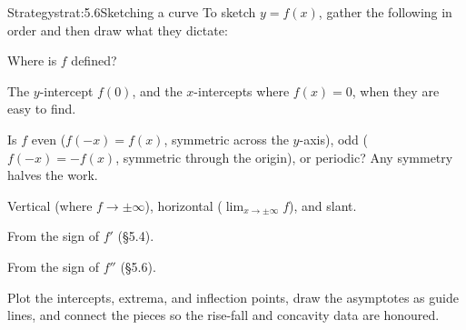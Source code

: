 \documentclass[a4paper,12pt,oneside]{memoir}
\begin{document}
\begin{envstrategy}{Strategy}{strat:5.6}{Sketching a curve}
To sketch \(y = f(x)\), gather the following in order and then draw what they dictate:

\begin{steps}
  \item {} Where is \(f\) defined?
  \item {} The \(y\)-intercept \(f(0)\), and the \(x\)-intercepts where \(f(x) = 0\), when they are easy to find.
  \item {} Is \(f\) even (\(f(-x) = f(x)\), symmetric across the \(y\)-axis), odd (\(f(-x) = -f(x)\), symmetric through the origin), or periodic? Any symmetry halves the work.
  \item {} Vertical (where \(f \to \pm\infty\)), horizontal (\(\lim_{x \to \pm\infty} f\)), and slant.
  \item {} From the sign of \(f'\) (§5.4).
  \item {} From the sign of \(f''\) (§5.6).
  \item {} Plot the intercepts, extrema, and inflection points, draw the asymptotes as guide lines, and connect the pieces so the rise-fall and concavity data are honoured.
\end{steps}
\end{envstrategy}
\end{document}

